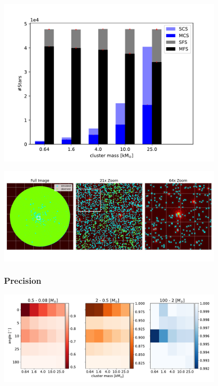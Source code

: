 \documentclass{beamer}
\begin{document}
\begin{frame}
\begin{figure}
\centering
\includegraphics[width=\textwidth,height=\textheight,keepaspectratio]{Images/25_n_stars.pdf}
\end{figure}
\end{frame}

\begin{frame}
\begin{figure}
\centering
\includegraphics[width=\textwidth,height=\textheight,keepaspectratio]{Images/fits_sim_obs.png}
\end{figure}
\end{frame}

\begin{frame}
\begin{figure}
\centering
\frametitle{Precision}
\includegraphics[width=\textwidth,height=\textheight,keepaspectratio]{Images/25_precision.pdf}
\end{figure}
\end{frame}
\end{document}
